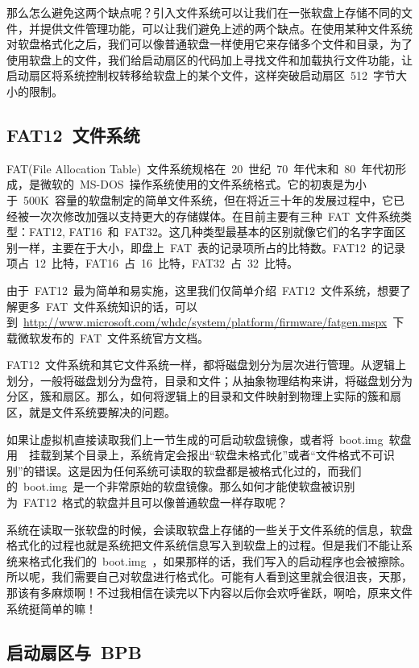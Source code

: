 那么怎么避免这两个缺点呢？引入文件系统可以让我们在一张软盘上存储不同的文件，并提供文件管理功能，可以让我们避免上述的两个缺点。在使用某种文件系统对软盘格式化之后，我们可以像普通软盘一样使用它来存储多个文件和目录，为了使用软盘上的文件，我们给启动扇区的代码加上寻找文件和加载执行文件功能，让启动扇区将系统控制权转移给软盘上的某个文件，这样突破启动扇区~512~字节大小的限制。

\subsection{FAT12~文件系统}

FAT(File Allocation Table)~文件系统规格在~20~世纪~70~年代末和~80~年代初形成，是微软的~MS-DOS~操作系统使用的文件系统格式。它的初衷是为小于~500K~容量的软盘制定的简单文件系统，但在将近三十年的发展过程中，它已经被一次次修改加强以支持更大的存储媒体。在目前主要有三种~FAT~文件系统类型：FAT12, FAT16~和~FAT32。这几种类型最基本的区别就像它们的名字字面区别一样，主要在于大小，即盘上~FAT~表的记录项所占的比特数。FAT12~的记录项占~12~比特，FAT16~占~16~比特，FAT32~占~32~比特。

由于~FAT12~最为简单和易实施，这里我们仅简单介绍~FAT12~文件系统，想要了解更多~FAT~文件系统知识的话，可以到~\url{http://www.microsoft.com/whdc/system/platform/firmware/fatgen.mspx}~下载微软发布的~FAT~文件系统官方文档。

FAT12~文件系统和其它文件系统一样，都将磁盘划分为层次进行管理。从逻辑上划分，一般将磁盘划分为盘符，目录和文件；从抽象物理结构来讲，将磁盘划分为分区，簇和扇区。那么，如何将逻辑上的目录和文件映射到物理上实际的簇和扇区，就是文件系统要解决的问题。

如果让虚拟机直接读取我们上一节生成的可启动软盘镜像，或者将~boot.img~软盘用~~挂载到某个目录上，系统肯定会报出“软盘未格式化”或者“文件格式不可识别”的错误。这是因为任何系统可读取的软盘都是被格式化过的，而我们的~boot.img~是一个非常原始的软盘镜像。那么如何才能使软盘被识别为~FAT12~格式的软盘并且可以像普通软盘一样存取呢？

系统在读取一张软盘的时候，会读取软盘上存储的一些关于文件系统的信息，软盘格式化的过程也就是系统把文件系统信息写入到软盘上的过程。但是我们不能让系统来格式化我们的~boot.img~，如果那样的话，我们写入的启动程序也会被擦除。所以呢，我们需要自己对软盘进行格式化。\blacksmiley 可能有人看到这里就会很沮丧，天那，那该有多麻烦啊！不过我相信在读完以下内容以后你会欢呼雀跃，啊哈，原来文件系统挺简单的嘛！

\subsection{启动扇区与~BPB}

